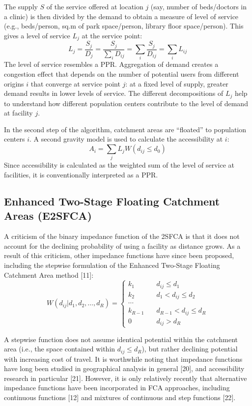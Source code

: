 \documentclass[10pt,letterpaper]{article}
\begin{document}
The supply \(S\) of the service offered at location \(j\) (say, number
of beds/doctors in a clinic) is then divided by the demand to obtain a
measure of level of service (e.g., beds/person, sq.m of park
space/person, library floor space/person). This gives a level of service
\(L_j\) at the service point: \[
L_j = \frac{S_j}{D_j} = \frac{S_j}{\sum_iD_{ij}} = \sum_i\frac{S_j}{D_{ij}}=\sum_iL_{ij}
\] The level of service resembles a PPR. Aggregation of demand creates a
congestion effect that depends on the number of potential users from
different origins \(i\) that converge at service point \(j\): at a fixed
level of supply, greater demand results in lower levels of service. The
different decompositions of \(L_j\) help to understand how different
population centers contribute to the level of demand at facility \(j\).

In the second step of the algorithm, catchment areas are ``floated'' to
population centers \(i\). A second gravity model is used to calculate
the accessibility at \(i\): \[
A_i = \sum_j{L_jW(d_{ij}\leq d_0)}
\] Since accessibility is calculated as the weighted sum of the level of
service at facilities, it is conventionally interpreted as a PPR.

\subsection{Enhanced Two-Stage Floating Catchment Areas
(E2SFCA)}\label{enhanced-two-stage-floating-catchment-areas-e2sfca}

A criticism of the binary impedance function of the 2SFCA is that it
does not account for the declining probability of using a facility as
distance grows. As a result of this criticism, other impedance functions
have since been proposed, including the stepwise formulation of the
Enhanced Two-Stage Floating Catchment Area method {[}11{]}: \[
W(d_{ij}|d_1, d_2, \dots, d_R) = \left\{
        \begin{array}{ll}
            k_1 & \quad d_{ij} \leq d_1 \\
            k_2 & \quad d_1 < d_{ij} \leq d_2 \\
            \dotsb \\
            k_{R-1} & \quad d_{R-1} < d_{ij} \leq d_R \\
            0 & \quad d_{ij} > d_R
        \end{array}
    \right.
\]

A stepwise function does not assume identical potential within the
catchment area (i.e., the space contained within \(d_{ij} \leq d_R\)),
but rather declining potential with increasing cost of travel. It is
worthwhile noting that impedance functions have long been studied in
geographical analysis in general {[}20{]}, and accessibility research in
particular {[}21{]}. However, it is only relatively recently that
alternative impedance functions have been incorporated in FCA
approaches, including continuous functions {[}12{]} and mixtures of
continuous and step functions {[}22{]}.
\end{document}
